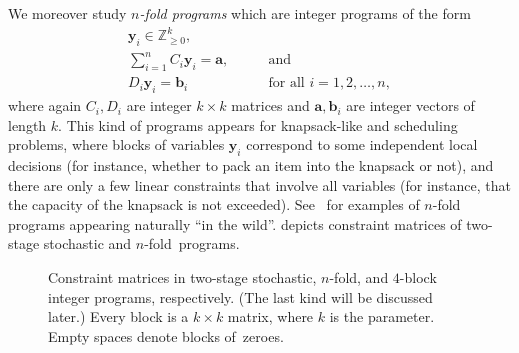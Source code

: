 \documentclass{article}
\renewcommand{\geq}{\geqslant}
\newcommand{\Z}{\mathbb{Z}}
\newcommand{\Zn}{\Z_{\geq 0}}
\newcommand{\tup}[1]{{\mathbf{#1}}}
\newcommand{\yy}{\tup y}
\newcommand{\av}{\tup a}
\newcommand{\bb}{\tup b}
\begin{document}
We moreover study {\em{$n$-fold programs}} which are integer programs of the form
\begin{align}
    \yy_i\in \Zn^k, &\nonumber \\
    \sum_{i=1}^n C_i\yy_i = \av,\nonumber & \qquad \textrm{and} \tag{$\clubsuit$}\label{eq:nfold-form}\\
    D_i\yy_i = \bb_i & \qquad \textrm{for all }i=1,2,\ldots,n,\nonumber
\end{align}
where again $C_i,D_i$ are integer $k\times k$ matrices and $\av,\bb_i$ are integer vectors of length $k$. This kind of programs appears for knapsack-like and scheduling problems, where blocks of variables $\yy_i$ correspond to some independent local decisions (for instance, whether to pack an item into the knapsack or not), and there are only a few linear constraints that involve all variables (for instance, that the capacity of the knapsack is not exceeded). See~\cite{ChenMYZ17,DeLoera2008,GavenciakKK22,JansenKMR22,KnopK18,KnopKLMO21,KnopKM20,KnopKM20b} for examples of $n$-fold programs appearing naturally ``in the wild''.  depicts constraint matrices of two-stage stochastic and $n$-fold~programs.

\begin{figure}[h]
\centering
{}

    \caption{Constraint matrices in two-stage stochastic, $n$-fold, and $4$-block integer programs, respectively. (The last kind will be discussed later.) Every block is a $k\times k$ matrix, where $k$ is the parameter. Empty spaces denote blocks of~zeroes.}\label{fig:blocks}
\end{figure}
\end{document}
